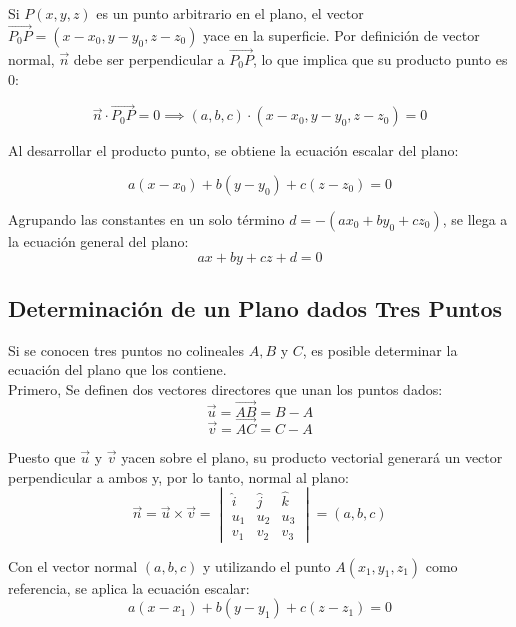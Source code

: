 Si $P(x, y, z)$ es un punto arbitrario en el plano, el vector $\vec{P_0P} = (x-x_0, y-y_0, z-z_0)$ yace en la superficie. Por definición de vector normal, $\vec{n}$ debe ser perpendicular a $\vec{P_0P}$, lo que implica que su producto punto es $0$:

$$ \vec{n} \cdot \vec{P_0P} = 0 \implies (a, b, c) \cdot (x-x_0, y-y_0, z-z_0) = 0 $$

Al desarrollar el producto punto, se obtiene la ecuación escalar del plano:

$$ a(x - x_0) + b(y - y_0) + c(z - z_0) = 0 $$

Agrupando las constantes en un solo término $d = -(ax_0 + by_0 + cz_0)$, se llega a la ecuación general del plano:
$$ ax + by + cz + d = 0 $$

\subsection{Determinación de un Plano dados Tres Puntos}

Si se conocen tres puntos no colineales $A, B$ y $C$, es posible determinar la ecuación del plano que los contiene. \\

Primero, Se definen dos vectores directores que unan los puntos dados:
    $$ \vec{u} = \vec{AB} = B - A $$
    $$ \vec{v} = \vec{AC} = C - A $$

Puesto que $\vec{u}$ y $\vec{v}$ yacen sobre el plano, su producto vectorial generará un vector perpendicular a ambos y, por lo tanto, normal al plano:
    $$ \vec{n} = \vec{u} \times \vec{v} = \begin{vmatrix} \hat{i} & \hat{j} & \hat{k} \\ u_1 & u_2 & u_3 \\ v_1 & v_2 & v_3 \end{vmatrix} = (a, b, c) $$

Con el vector normal $(a, b, c)$ y utilizando el punto $A(x_1, y_1, z_1)$ como referencia, se aplica la ecuación escalar:
    $$ a(x-x_1) + b(y-y_1) + c(z-z_1) = 0 $$


